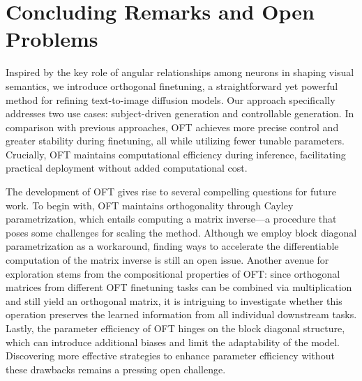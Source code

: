 \section{Concluding Remarks and Open Problems}

Inspired by the key role of angular relationships among neurons in shaping visual semantics, we introduce orthogonal finetuning, a straightforward yet powerful method for refining text-to-image diffusion models. Our approach specifically addresses two use cases: subject-driven generation and controllable generation. In comparison with previous approaches, OFT achieves more precise control and greater stability during finetuning, all while utilizing fewer tunable parameters. Crucially, OFT maintains computational efficiency during inference, facilitating practical deployment without added computational cost.

The development of OFT gives rise to several compelling questions for future work. To begin with, OFT maintains orthogonality through Cayley parametrization, which entails computing a matrix inverse—a procedure that poses some challenges for scaling the method. Although we employ block diagonal parametrization as a workaround, finding ways to accelerate the differentiable computation of the matrix inverse is still an open issue. Another avenue for exploration stems from the compositional properties of OFT: since orthogonal matrices from different OFT finetuning tasks can be combined via multiplication and still yield an orthogonal matrix, it is intriguing to investigate whether this operation preserves the learned information from all individual downstream tasks. Lastly, the parameter efficiency of OFT hinges on the block diagonal structure, which can introduce additional biases and limit the adaptability of the model. Discovering more effective strategies to enhance parameter efficiency without these drawbacks remains a pressing open challenge.

